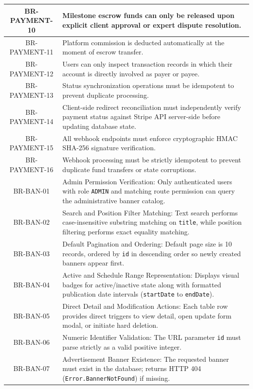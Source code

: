 \begin{longtable}{|c|p{12cm}|}
    BR-PAYMENT-10 & Milestone escrow funds can only be released upon explicit client approval or expert dispute resolution. \\ \hline
    BR-PAYMENT-11 & Platform commission is deducted automatically at the moment of escrow transfer. \\ \hline
    BR-PAYMENT-12 & Users can only inspect transaction records in which their account is directly involved as payer or payee. \\ \hline
    BR-PAYMENT-13 & Status synchronization operations must be idempotent to prevent duplicate processing. \\ \hline
    BR-PAYMENT-14 & Client-side redirect reconciliation must independently verify payment status against Stripe API server-side before updating database state. \\ \hline
    BR-PAYMENT-15 & All webhook endpoints must enforce cryptographic HMAC SHA-256 signature verification. \\ \hline
    BR-PAYMENT-16 & Webhook processing must be strictly idempotent to prevent duplicate fund transfers or state corruptions. \\ \hline
    BR-BAN-01 & Admin Permission Verification: Only authenticated users with role \texttt{ADMIN} and matching route permission can query the administrative banner catalog. \\ \hline
    BR-BAN-02 & Search and Position Filter Matching: Text search performs case-insensitive substring matching on \texttt{title}, while position filtering performs exact equality matching. \\ \hline
    BR-BAN-03 & Default Pagination and Ordering: Default page size is 10 records, ordered by \texttt{id} in descending order so newly created banners appear first. \\ \hline
    BR-BAN-04 & Active and Schedule Range Representation: Displays visual badges for active/inactive state along with formatted publication date intervals (\texttt{startDate} to \texttt{endDate}). \\ \hline
    BR-BAN-05 & Direct Detail and Modification Actions: Each table row provides direct triggers to view detail, open update form modal, or initiate hard deletion. \\ \hline
    BR-BAN-06 & Numeric Identifier Validation: The URL parameter \texttt{id} must parse strictly as a valid positive integer. \\ \hline
    BR-BAN-07 & Advertisement Banner Existence: The requested banner must exist in the database; returns HTTP 404 (\texttt{Error.\allowbreak Banner\allowbreak Not\allowbreak Found}) if missing. \\ \hline

\end{longtable}

